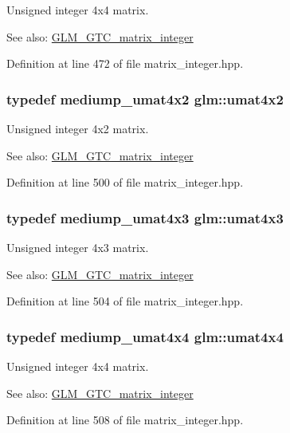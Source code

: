 Unsigned integer 4x4 matrix. \begin{Desc}
\item[See also:]\hyperlink{group__gtc__matrix__integer}{GLM\_\-GTC\_\-matrix\_\-integer} \end{Desc}


Definition at line 472 of file matrix\_\-integer.hpp.\hypertarget{group__gtc__matrix__integer_g13e8392218e9b6e1b7f194a21b5c88bf}{
\subsubsection[umat4x2]{\setlength{\rightskip}{0pt plus 5cm}typedef mediump\_\-umat4x2 {\bf glm::umat4x2}}}
\label{group__gtc__matrix__integer_g13e8392218e9b6e1b7f194a21b5c88bf}


Unsigned integer 4x2 matrix. \begin{Desc}
\item[See also:]\hyperlink{group__gtc__matrix__integer}{GLM\_\-GTC\_\-matrix\_\-integer} \end{Desc}


Definition at line 500 of file matrix\_\-integer.hpp.\hypertarget{group__gtc__matrix__integer_g08373f5588a54da1a48e5e55c7d51004}{
\subsubsection[umat4x3]{\setlength{\rightskip}{0pt plus 5cm}typedef mediump\_\-umat4x3 {\bf glm::umat4x3}}}
\label{group__gtc__matrix__integer_g08373f5588a54da1a48e5e55c7d51004}


Unsigned integer 4x3 matrix. \begin{Desc}
\item[See also:]\hyperlink{group__gtc__matrix__integer}{GLM\_\-GTC\_\-matrix\_\-integer} \end{Desc}


Definition at line 504 of file matrix\_\-integer.hpp.\hypertarget{group__gtc__matrix__integer_ge0931b79e808fb0983848778a60eb548}{
\subsubsection[umat4x4]{\setlength{\rightskip}{0pt plus 5cm}typedef mediump\_\-umat4x4 {\bf glm::umat4x4}}}
\label{group__gtc__matrix__integer_ge0931b79e808fb0983848778a60eb548}


Unsigned integer 4x4 matrix. \begin{Desc}
\item[See also:]\hyperlink{group__gtc__matrix__integer}{GLM\_\-GTC\_\-matrix\_\-integer} \end{Desc}


Definition at line 508 of file matrix\_\-integer.hpp.
